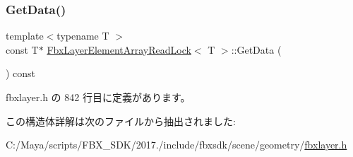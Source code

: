 \subsubsection{\texorpdfstring{Get\+Data()}{GetData()}}
{\footnotesize\ttfamily template$<$typename T $>$ \\
const T$\ast$ \hyperlink{struct_fbx_layer_element_array_read_lock}{Fbx\+Layer\+Element\+Array\+Read\+Lock}$<$ T $>$\+::Get\+Data (\begin{DoxyParamCaption}{ }\end{DoxyParamCaption}) const\hspace{0.3cm}{\ttfamily [inline]}}



 fbxlayer.\+h の 842 行目に定義があります。



この構造体詳解は次のファイルから抽出されました\+:\begin{DoxyCompactItemize}
\item 
C\+:/\+Maya/scripts/\+F\+B\+X\+\_\+\+S\+D\+K/2017./include/fbxsdk/scene/geometry/\hyperlink{fbxlayer_8h}{fbxlayer.\+h}\end{DoxyCompactItemize}
